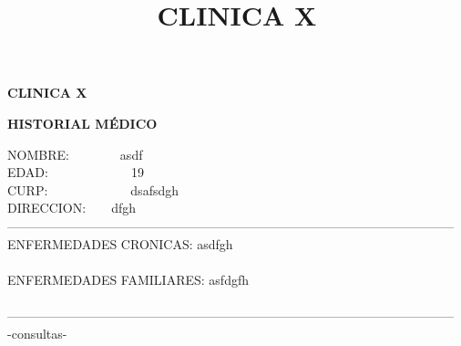 \documentclass[10pt,a4paper]{letter}
\title{\bf CLINICA X}
\begin{document}
\begin{center}
{\scshape\LARGE \bf CLINICA X\par}
{\bf HISTORIAL MÉDICO\\}
\end{center}
NOMBRE:\ \ \ \ \ \ \ \ asdf\\
EDAD:\ \ \ \ \ \ \ \ \ \ \ \ \ 19\\
CURP:\ \ \ \ \ \ \ \ \ \ \ \ \ dsafsdgh \\
DIRECCION:\ \ \ \ dfgh\\
--------------------------------------------------------------------------------------------------------- \\
ENFERMEDADES CRONICAS: asdfgh\\ \\
ENFERMEDADES FAMILIARES: asfdgfh \\ \\
--------------------------------------------------------------------------------------------------------- \\-consultas-
\end{document}
